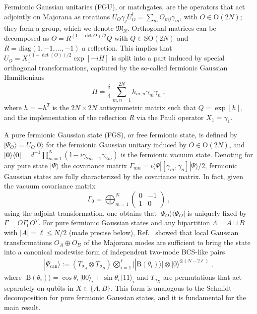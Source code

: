 \documentclass[prx,twocolumn,superscriptaddress,aps,10pt, frontmatterverbose, reprint,footinbib,longbibliography=true]{revtex4-2}
\providecommand{\DIFaddtex}[1]{{\protect\color{red}#1}} %
\providecommand{\DIFaddbegin}{\protect\color{red}} %
\providecommand{\DIFaddend}{\protect\color{black}} %
\providecommand{\DIFaddtex}[1]{\texorpdfstring{\DIFaddtex{#1}}{#1}} %
\providecommand{\DIFadd}[1]{\texorpdfstring{\DIFaddtex{#1}}{#1}} %
\newcommand{\DIFaddincludegraphics}[2][]{{\color{blue}\fbox{\DIFOincludegraphics[#1]{#2}}}} %
\DeclareRobustCommand{\DIFaddbegin}{\DIFOaddbegin \let\includegraphics\DIFaddincludegraphics} %
\DeclareRobustCommand{\DIFaddend}{\DIFOaddend \let\includegraphics\DIFOincludegraphics} %
\begin{document}
Fermionic Gaussian unitaries (FGU), or matchgates, are the operators that act adjointly on Majorana as rotations $U_O\gamma_j U_O^\dagger = \sum_{m}O_{mj}\gamma_m$, with $O\in \mathrm{O}(2N)$; they form a group, which we denote $\mathfrak{M}_N$. 
Orthogonal matrices can be decomposed as $O=R^{(1-\det O)/2}Q$ with $Q\in \mathrm{SO}(2N)$ and $R=\mathrm{diag}(1,-1,\dots,-1)$  a reflection.
This implies that $U_O=X_1^{(1-\det(O))/2}\exp[-iH]$ is split into a part induced by special orthogonal transformations, captured by the so-called fermionic Gaussian Hamiltonians 
\begin{equation}
    H= \frac{i}{4}\sum_{m,n=1}^{2N} h_{m,n} \gamma_m\gamma_n\;,\label{eq:ham}
\end{equation}
where $h=-h^T$ is the $2N\times 2N$ antisymmetric matrix such that $Q=\exp[h]$, and the implementation of the reflection $R$ via the Pauli operator $X_1=\gamma_1$. 

A pure fermionic Gaussian state (FGS), or free fermionic state, is defined by $|\Psi_O\rangle=U_O|\mathbf{0}\rangle$ for the fermionic Gaussian unitary induced by $O\in \mathrm{O}(2N)$, and $|\mathbf{0}\rangle\langle\mathbf{0}| = d^{-1}\prod_{m=1}^{N}(\mathbb{I}-i\gamma_{2m-1}\gamma_{2m})$ is the fermionic vacuum state. 
Denoting for any pure state $|\Psi\rangle$ the covariance matrix $\Gamma_{mn}=i\langle \Psi|[\gamma_m,\gamma_n]|\Psi\rangle/2$, fermionic Gaussian states are fully characterized by the covariance matrix. In fact, given the vacuum covariance matrix
\begin{equation}
    \Gamma_0= { \bigoplus_{m=1}^N \begin{pmatrix}
        0 &-1 \\1&0
    \end{pmatrix}}\;,
\end{equation}
using the adjoint transformation, one obtains that $|\Psi_O\rangle\langle \Psi_O|$ is uniquely fixed by $\Gamma= O\Gamma_0 O^T$. 
For pure fermionic Gaussian states and any bipartition $\Lambda=A\sqcup B$ with $|A|=\ell\le N/2$ (made precise below), Ref.~\cite{BoteroReznik2004} showed that local \DIFaddbegin \DIFadd{Gaussian transformations $O_A\oplus O_B$ of the Majorana modes }\DIFaddend are sufficient to bring the state into a canonical modewise form of independent two-mode BCS-like pairs 
\begin{equation}
\begin{split}
     |\Psi_{\mathrm{can}}\rangle
:= (T_{\sigma_{A}}\otimes T_{\sigma_{B}})\bigotimes_{i=1}^{\ell} [|\mathrm{B}(\theta_i)\rangle]\otimes |0\rangle^{\otimes (N-2\ell)}\;,
\end{split}
\label{eq:can_form}
\end{equation} 
where $|\mathrm{B}(\theta_i)\rangle=\cos\theta_i\,|00\rangle_i+\sin\theta_i\,|11\rangle_i$  and $T_{\sigma_X}$ are permutations that act separately on qubits in $X\in \{A,B\}$. This form is analogous to the Schmidt decomposition for pure fermionic Gaussian states, and it is fundamental for the main result.
\end{document}
